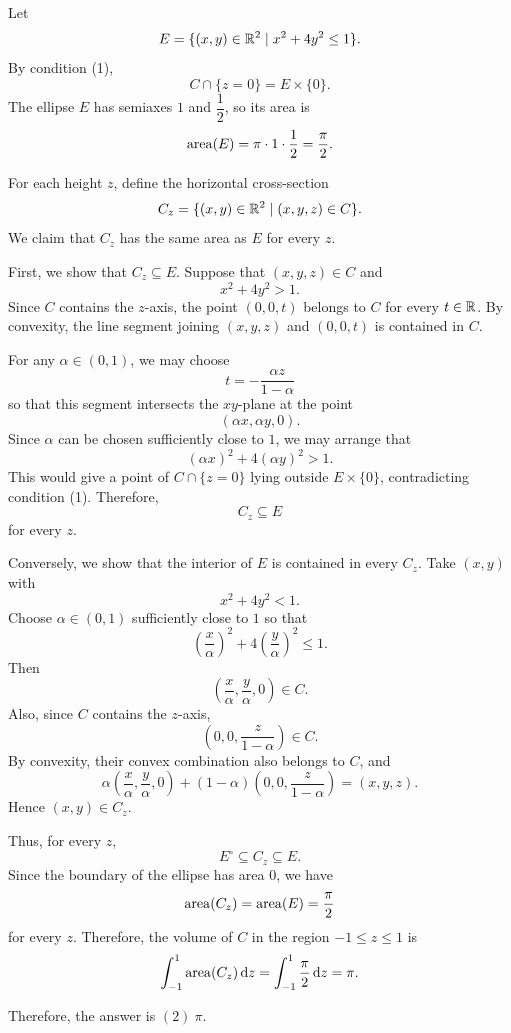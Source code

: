     \begin{solution}
        Let
        \[
            E=\{(x,y)\in\mathbb{R}^2\mid x^2+4y^2\leq 1\}.
        \]
        By condition (1),
        \[
            C\cap\{z=0\}=E\times\{0\}.
        \]
        The ellipse $E$ has semiaxes $1$ and $\dfrac{1}{2}$, so its area is
        \[
            \operatorname{area}(E)
            =
            \pi\cdot 1\cdot \frac{1}{2}
            =
            \frac{\pi}{2}.
        \]

        For each height $z$, define the horizontal cross-section
        \[
            C_z
            =
            \{(x,y)\in\mathbb{R}^2\mid (x,y,z)\in C\}.
        \]
        We claim that $C_z$ has the same area as $E$ for every $z$.

        First, we show that $C_z\subseteq E$. Suppose that $(x,y,z)\in C$ and
        \[
            x^2+4y^2>1.
        \]
        Since $C$ contains the $z$-axis, the point $(0,0,t)$ belongs to $C$ for every $t\in\mathbb{R}$. By
        convexity, the line segment joining $(x,y,z)$ and $(0,0,t)$ is contained in $C$.

        For any $\alpha\in(0,1)$, we may choose
        \[
            t=-\frac{\alpha z}{1-\alpha}
        \]
        so that this segment intersects the $xy$-plane at the point
        \[
            (\alpha x,\alpha y,0).
        \]
        Since $\alpha$ can be chosen sufficiently close to $1$, we may arrange that
        \[
            (\alpha x)^2+4(\alpha y)^2>1.
        \]
        This would give a point of $C\cap\{z=0\}$ lying outside $E\times\{0\}$, contradicting
        condition (1). Therefore,
        \[
            C_z\subseteq E
        \]
        for every $z$.

        Conversely, we show that the interior of $E$ is contained in every $C_z$. Take $(x,y)$ with
        \[
            x^2+4y^2<1.
        \]
        Choose $\alpha\in(0,1)$ sufficiently close to $1$ so that
        \[
            \left(\frac{x}{\alpha}\right)^2
            +
            4\left(\frac{y}{\alpha}\right)^2
            \leq 1.
        \]
        Then
        \[
            \left(\frac{x}{\alpha},\frac{y}{\alpha},0\right)\in C.
        \]
        Also, since $C$ contains the $z$-axis,
        \[
            \left(0,0,\frac{z}{1-\alpha}\right)\in C.
        \]
        By convexity, their convex combination also belongs to $C$, and
        \[
            \alpha
            \left(\frac{x}{\alpha},\frac{y}{\alpha},0\right)
            +
            (1-\alpha)
            \left(0,0,\frac{z}{1-\alpha}\right)
            =
            (x,y,z).
        \]
        Hence $(x,y)\in C_z$.

        Thus, for every $z$,
        \[
            E^\circ\subseteq C_z\subseteq E.
        \]
        Since the boundary of the ellipse has area $0$, we have
        \[
            \operatorname{area}(C_z)=\operatorname{area}(E)=\frac{\pi}{2}
        \]
        for every $z$. Therefore, the volume of $C$ in the region $-1\leq z\leq 1$ is
        \[
            \int_{-1}^{1}\operatorname{area}(C_z)\mathop{}\!\mathrm{d} z
            =
            \int_{-1}^{1}\frac{\pi}{2}\mathop{}\!\mathrm{d} z
            =
            \pi.
        \]

        Therefore, the answer is $\boxed{(2)\ \pi}$.
    \end{solution}

